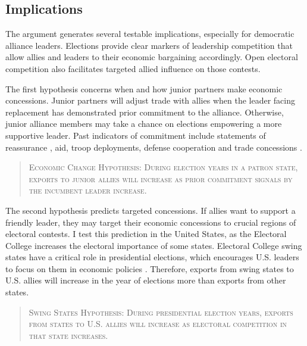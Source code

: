 \documentclass[12pt]{article}
\begin{document}
\subsection{Implications}



The argument generates several testable implications, especially for democratic alliance leaders.
Elections provide clear markers of leadership competition that allow allies and leaders to their economic bargaining accordingly. 
Open electoral competition also facilitates targeted allied influence on those contests. 


The first hypothesis concerns when and how junior partners make economic concessions. 
Junior partners will adjust trade with allies when the leader facing replacement has demonstrated prior commitment to the alliance. 
Otherwise, junior alliance members may take a chance on elections empowering a more supportive leader. 
Past indicators of commitment include statements of reassurance \citep{Blankenship2020}, aid, troop deployments, defense cooperation \citep{Morrow1994, Alley2021isq} and trade concessions \citep{WolfordKim2017}.


\begin{quote}
\textsc{Economic Change Hypothesis: During election years in a patron state, exports to junior allies will increase as prior commitment signals by the incumbent leader increase.}
\end{quote}



The second hypothesis predicts targeted concessions.
If allies want to support a friendly leader, they may target their economic concessions to crucial regions of electoral contests. 
I test this prediction in the United States, as the Electoral College increases the electoral importance of some states.
Electoral College swing states have a critical role in presidential elections, which encourages U.S. leaders to focus on them in economic policies \citep{KrinerReeves2015, Conconietal2017}.
Therefore, exports from swing states to U.S. allies will increase in the year of elections more than exports from other states.


\begin{quote}
\textsc{Swing States Hypothesis: During presidential election years, exports from states to U.S. allies will increase as electoral competition in that state increases.}
\end{quote}

%
%
%
\end{document}
